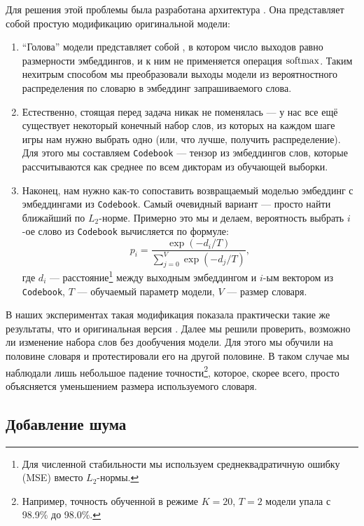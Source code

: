 Для решения этой проблемы была разработана архитектура \cbenquirer{}. Она
представляет собой простую модификацию оригинальной модели:
\begin{enumerate}
    \item ``Голова'' модели представляет собой \enquirer{}, в котором число
    выходов равно размерности эмбеддингов, и к ним не применяется операция
    $\operatorname{\text{softmax}}$. Таким нехитрым способом мы преобразовали выходы модели из
    вероятностного распределения по словарю в эмбеддинг запрашиваемого слова.
    \item Естественно, стоящая перед \cbenquirer{} задача никак не поменялась ---
    у нас все ещё существует некоторый конечный набор слов, из которых на
    каждом шаге игры нам нужно выбрать одно (или, что лучше, получить
    распределение). Для этого мы составляем \texttt{Codebook} --- тензор из
    эмбеддингов слов, которые рассчитываются как среднее по всем дикторам из
    обучающей выборки.
    \item Наконец, нам нужно как-то сопоставить возвращаемый моделью эмбеддинг
    с эмбеддингами из \texttt{Codebook}. Самый очевидный вариант --- просто
    найти ближайший по $L_2$-норме. Примерно это мы и делаем, вероятность
    выбрать $i$-ое слово из \texttt{Codebook} вычисляется по формуле:
    \begin{equation*}
        p_i = \frac{\exp{(-d_i/T)}}{\sum_{j=0}^{V}{\exp{(-d_j/T)}}},
    \end{equation*}
    где $d_i$ --- расстояние\footnote{
        Для численной стабильности мы используем среднеквадратичную ошибку (MSE)
        вместо $L_2$-нормы.
    } между выходным эмбеддингом и $i$-ым вектором из \texttt{Codebook}, $T$ ---
    обучаемый параметр модели, $V$ --- размер словаря.
\end{enumerate}

В наших экспериментах такая модификация показала практически такие же
результаты, что и оригинальная версия \enquirer{}. Далее мы решили
проверить, возможно ли изменение набора слов без дообучения модели. Для этого
мы обучили \cbenquirer{} на половине словаря и протестировали его на другой
половине. В таком случае мы наблюдали лишь небольшое падение точности\footnote{
    Например, точность обученной в режиме $K = 20$, $T = 2$ модели упала с
    98.9\% до 98.0\%.
}, которое,
скорее всего, просто объясняется уменьшением размера используемого словаря.

\subsection{Добавление шума}

